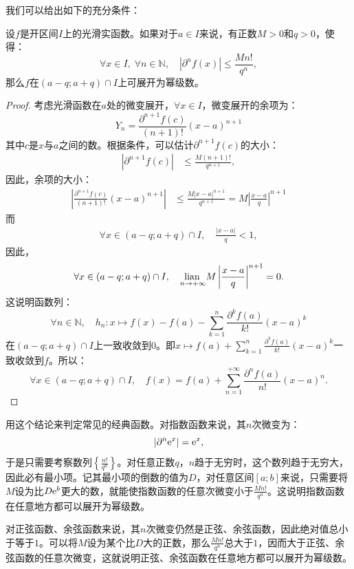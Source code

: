 \documentclass[12pt,UTF8]{ctexbook}
\begin{document}
\begin{appendix}
我们可以给出如下的充分条件：
\begin{tm}\label{tm:c-5-10}
    设$f$是开区间$I$上的光滑实函数。如果对于$a\in I$来说，有正数$M>0$和$q>0$，使得：
    $$ \forall x \in I, \; \forall n \in \mathbb{N},\quad |\partial^n f (x)| \leqslant \frac{M n!}{q^n}, $$
    那么$f$在$(a-q;a+q)\cap I$上可展开为幂级数。
\end{tm}

\begin{proof}
    考虑光滑函数在$a$处的微变展开，$\forall x \in I$，微变展开的余项为：
    $$ Y_n = \frac{\partial^{n+1} f (c)}{(n+1)!}(x - a)^{n+1} $$
    其中$c$是$x$与$a$之间的数。根据条件，可以估计$\partial^{n+1} f (c)$的大小：
    \begin{align*}
        |\partial^{n+1} f (c)| &\leqslant \frac{M (n+1)!}{q^{n+1}},
    \end{align*}
    因此，余项的大小：
    \begin{align*}
        \left|\frac{\partial^{n+1} f (c)}{(n+1)!}(x - a)^{n+1}\right| &\leqslant \frac{M |x - a|^{n+1}}{q^{n+1}} = M\left|\frac{x - a}{q}\right|^{n+1}
    \end{align*}
    而
    \begin{align*}
        \forall x\in(a-q;a+q)\cap I, \quad \frac{|x - a|}{q} < 1,
    \end{align*}
    因此，
    $$ \forall x\in(a-q;a+q)\cap I, \quad  \underset{n\to +\infty}{\operatorname{lian}\,}M\left|\frac{x - a}{q}\right|^{n+1} = 0. $$
    这说明函数列：
    $$ \forall n\in\mathbb{N}, \quad h_n: x\mapsto f(x) - f(a) - \sum_{k=1}^n \frac{\partial^k f (a)}{k!}(x - a)^k $$
    在$(a-q;a+q)\cap I$上一致收敛到$0$。即$\displaystyle x\mapsto f(a) + \sum_{k=1}^n \frac{\partial^k f (a)}{k!}(x - a)^k$一致收敛到$f$。所以：
    $$ \forall x\in (a-q;a+q)\cap I,\quad f(x) = f(a) + \sum_{n=1}^{+\infty} \frac{\partial^n f (a)}{n!}(x - a)^n. $$
\end{proof}

用这个结论来判定常见的经典函数。对指数函数来说，其$n$次微变为：
$$ |\partial^n \mathrm{e}^x| = \mathrm{e}^x, $$
于是只需要考察数列$\left\{\frac{n!}{q^n}\right\}$。对任意正数$q$，$n$趋于无穷时，这个数列趋于无穷大，因此必有最小项。记其最小项的倒数的值为$D$，对任意区间$[a;b]$来说，只需要将$M$设为比$D\mathrm{e}^b$更大的数，就能使指数函数的任意次微变小于$\frac{M n!}{q^n}$。这说明指数函数在任意地方都可以展开为幂级数。

对正弦函数、余弦函数来说，其$n$次微变仍然是正弦、余弦函数，因此绝对值总小于等于$1$。可以将$M$设为某个比$D$大的正数，那么$\frac{M n!}{q^n}$总大于$1$，因而大于正弦、余弦函数的任意次微变，这就说明正弦、余弦函数在任意地方都可以展开为幂级数。


\end{appendix}
\end{document}
